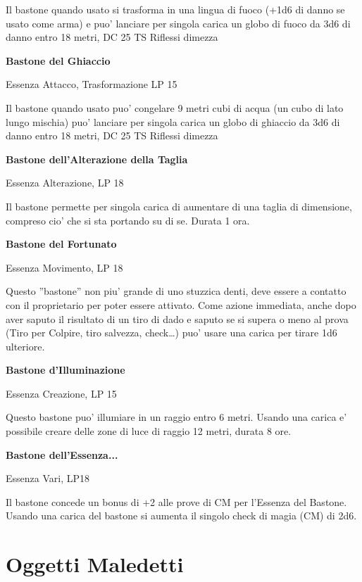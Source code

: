 \documentclass[a4paper,11pt,twoside,openany]{book}
\begin{document}
{		Il bastone quando usato si trasforma in una lingua di fuoco (+1d6 di danno se usato come arma) e puo' lanciare per singola carica un globo di fuoco da 3d6 di danno entro 18 metri, DC 25 TS Riflessi dimezza
		
		\textbf{Bastone del Ghiaccio}
		
		Essenza Attacco, Trasformazione LP 15
		
		Il bastone quando usato puo' congelare 9 metri cubi di acqua (un cubo di lato lungo mischia) puo' lanciare per singola carica un globo di ghiaccio da 3d6 di danno entro 18 metri, DC 25 TS Riflessi dimezza 
		
		\textbf{Bastone dell'Alterazione della Taglia}
		
		Essenza Alterazione, LP 18
		
		Il bastone permette per singola carica di aumentare di una taglia di dimensione, compreso cio' che si sta portando su di se. Durata 1 ora.
		
		\textbf{Bastone del Fortunato}
		
		Essenza Movimento, LP 18
		
		Questo ''bastone'' non piu' grande di uno stuzzica denti, deve essere a contatto con il proprietario per poter essere attivato. Come azione immediata, anche dopo aver saputo il risultato di un tiro di dado e saputo se si supera o meno al prova (Tiro per Colpire, tiro salvezza, check\ldots ) puo' usare una carica per tirare 1d6 ulteriore.
		
		\textbf{Bastone d'Illuminazione}
		
		Essenza Creazione, LP 15
		
		Questo bastone puo' illumiare in un raggio entro 6 metri. Usando una carica e' possibile creare delle zone di luce di raggio 12 metri, durata 8 ore.
		
		\textbf{Bastone dell'Essenza...}
		
		Essenza Vari, LP18
		
		Il bastone concede un bonus di +2 alle prove di CM per l'Essenza del Bastone. Usando una carica del bastone si aumenta il singolo check di magia (CM) di 2d6.
		
		\pagebreak
		
		\section{Oggetti Maledetti}
		
}
\end{document}
